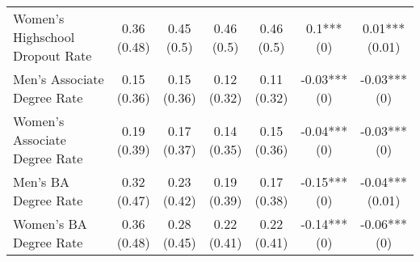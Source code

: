 \begin{landscape}
\begin{ThreePartTable}
\begin{longtable}[t]{>{\raggedright\arraybackslash}p{5cm}cccccc}
\hspace{1em}Women’s Highschool Dropout Rate & \specialcell{0.36\\(0.48)} & \specialcell{0.45\\(0.5)} & \specialcell{0.46\\(0.5)} & \specialcell{0.46\\(0.5)} & \specialcell{0.1***\\(0)} & \specialcell{0.01***\\(0.01)}\\
\addlinespace
\hspace{1em}Men’s Associate Degree Rate & \specialcell{0.15\\(0.36)} & \specialcell{0.15\\(0.36)} & \specialcell{0.12\\(0.32)} & \specialcell{0.11\\(0.32)} & \specialcell{-0.03***\\(0)} & \specialcell{-0.03***\\(0)}\\
\hspace{1em}Women’s Associate Degree Rate & \specialcell{0.19\\(0.39)} & \specialcell{0.17\\(0.37)} & \specialcell{0.14\\(0.35)} & \specialcell{0.15\\(0.36)} & \specialcell{-0.04***\\(0)} & \specialcell{-0.03***\\(0)}\\
\hspace{1em}Men’s BA Degree Rate & \specialcell{0.32\\(0.47)} & \specialcell{0.23\\(0.42)} & \specialcell{0.19\\(0.39)} & \specialcell{0.17\\(0.38)} & \specialcell{-0.15***\\(0)} & \specialcell{-0.04***\\(0.01)}\\
\hspace{1em}Women’s BA Degree Rate & \specialcell{0.36\\(0.48)} & \specialcell{0.28\\(0.45)} & \specialcell{0.22\\(0.41)} & \specialcell{0.22\\(0.41)} & \specialcell{-0.14***\\(0)} & \specialcell{-0.06***\\(0)}\\

\end{longtable}
\end{ThreePartTable}
\end{landscape}
